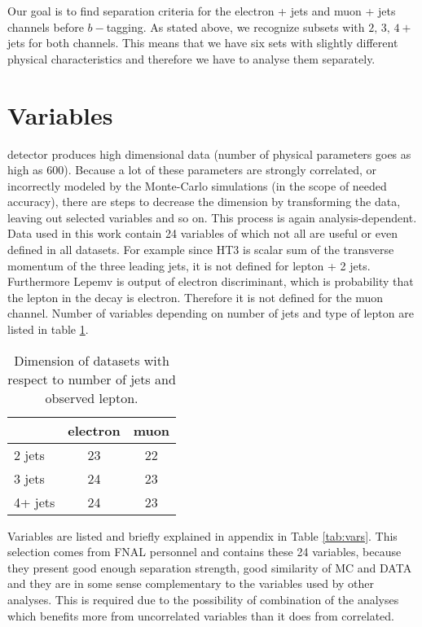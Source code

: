 Our goal is to find separation criteria for the electron + jets and muon + jets channels before $b-$tagging. As stated above, we recognize subsets with $2, \,3,\, 4+$ jets for both channels. This means that we have six sets with slightly different physical characteristics and therefore we have to analyse them separately. 

\section{Variables}\label{sec:Variables}

\dzero detector  produces high dimensional data (number of physical parameters  goes as high as $600$). Because a lot of these parameters are strongly correlated, or incorrectly modeled by the Monte-Carlo simulations (in the scope of needed accuracy), there are steps to decrease the dimension by transforming the data, leaving out selected variables and so on. This process is again analysis-dependent. Data used in this work contain 24 variables of which not all are useful or even defined in all datasets. For example since \textsf{HT3} is scalar sum of the transverse momentum of the three leading jets, it is not defined for lepton + 2 jets. Furthermore \textsf{Lepemv} is output of electron discriminant, which is probability that the lepton in the decay is electron. Therefore it is not defined for the muon channel. Number of variables depending on number of jets and type of lepton are listed in table \ref{tab:data-dims}.

\begin{table}[htb]
\caption{Dimension of datasets with respect to number of jets and observed lepton.}
\centering
\begin{tabular}{|l|c|c|}
\hline 
 & electron & muon \\ 
\hline 
2 jets & 23 & 22 \\ 
\hline 
3 jets & 24 & 23 \\ 
\hline 
4+ jets & 24 & 23 \\ 
\hline 
\end{tabular} 
\label{tab:data-dims}
\end{table}

Variables are listed and briefly explained in appendix in Table \ref{tab:vars}. This selection comes from  FNAL personnel and contains these 24 variables, because they present good enough separation strength, good similarity of MC and DATA and they are in some sense complementary to the variables used by other analyses. This is required due to the possibility of combination of the analyses which benefits more from uncorrelated variables than it does from correlated. 

